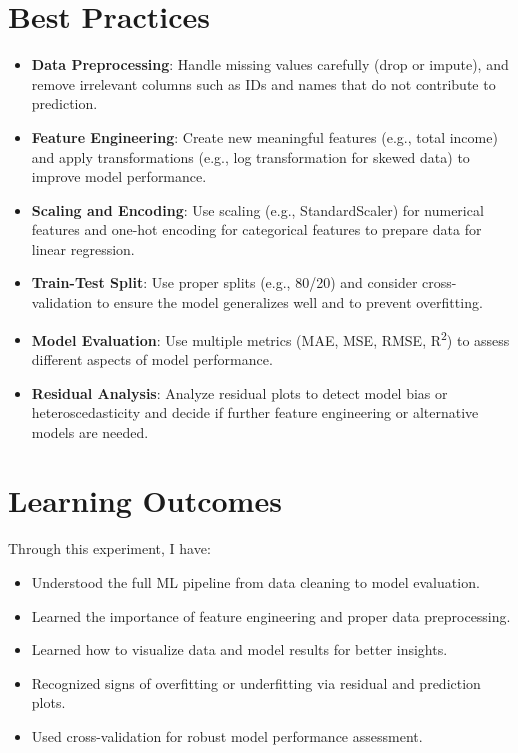 \documentclass{article}
\begin{document}
\section{Best Practices}
\begin{itemize}
    \item \textbf{Data Preprocessing}: Handle missing values carefully (drop or impute), and remove irrelevant columns such as IDs and names that do not contribute to prediction.
    
    \item \textbf{Feature Engineering}: Create new meaningful features (e.g., total income) and apply transformations (e.g., log transformation for skewed data) to improve model performance.
    
    \item \textbf{Scaling and Encoding}: Use scaling (e.g., StandardScaler) for numerical features and one-hot encoding for categorical features to prepare data for linear regression.
    
    \item \textbf{Train-Test Split}: Use proper splits (e.g., 80/20) and consider cross-validation to ensure the model generalizes well and to prevent overfitting.
    
    \item \textbf{Model Evaluation}: Use multiple metrics (MAE, MSE, RMSE, R\textsuperscript{2}) to assess different aspects of model performance.
    
    \item \textbf{Residual Analysis}: Analyze residual plots to detect model bias or heteroscedasticity and decide if further feature engineering or alternative models are needed.
\end{itemize}

\section{Learning Outcomes}
Through this experiment, I have:
\begin{itemize}
    \item Understood the full ML pipeline from data cleaning to model evaluation.
    
    \item Learned the importance of feature engineering and proper data preprocessing.
    
    \item Learned how to visualize data and model results for better insights.
    
    \item Recognized signs of overfitting or underfitting via residual and prediction plots.
    
    \item Used cross-validation for robust model performance assessment.
\end{itemize}
\end{document}
